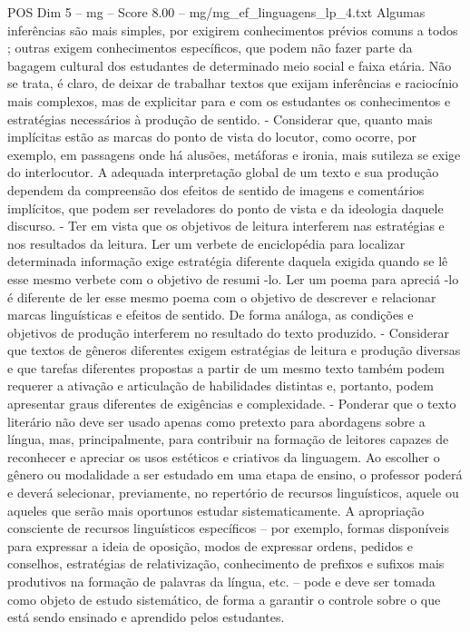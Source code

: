 \begin{textsample}{POS Dim 5 – mg – Score 8.00 – mg/mg\_ef\_linguagens\_lp\_4.txt}
Algumas inferências são mais simples, por exigirem conhecimentos prévios comuns a todos ; outras exigem conhecimentos específicos, que podem não fazer parte da bagagem cultural dos estudantes de determinado meio social e faixa etária.
Não se trata, é claro, de deixar de trabalhar textos que exijam inferências e raciocínio mais complexos, mas de explicitar para e com os estudantes os conhecimentos e estratégias necessários à produção de sentido. - Considerar que, quanto mais implícitas estão as marcas do ponto de vista do locutor, como ocorre, por exemplo, em passagens onde há alusões, metáforas e ironia, mais sutileza se exige do interlocutor.
A adequada interpretação global de um texto e sua produção dependem da compreensão dos efeitos de sentido de imagens e comentários implícitos, que podem ser reveladores do ponto de vista e da ideologia daquele discurso. - Ter em vista que os objetivos de leitura interferem nas estratégias e nos resultados da leitura.
Ler um verbete de enciclopédia para localizar determinada informação exige estratégia diferente daquela exigida quando se lê esse mesmo verbete com o objetivo de resumi -lo.
Ler um poema para apreciá -lo é diferente de ler esse mesmo poema com o objetivo de descrever e relacionar marcas linguísticas e efeitos de sentido.
De forma análoga, as condições e objetivos de produção interferem no resultado do texto produzido. - Considerar que textos de gêneros diferentes exigem estratégias de leitura e produção diversas e que tarefas diferentes propostas a partir de um mesmo texto também podem requerer a ativação e articulação de habilidades distintas e, portanto, podem apresentar graus diferentes de exigências e complexidade. - Ponderar que o texto literário não deve ser usado apenas como pretexto para abordagens sobre a língua, mas, principalmente, para contribuir na formação de leitores capazes de reconhecer e apreciar os usos estéticos e criativos da linguagem.
Ao escolher o gênero ou modalidade a ser estudado em uma etapa de ensino, o professor poderá e deverá selecionar, previamente, no repertório de recursos linguísticos, aquele ou aqueles que serão mais oportunos estudar sistematicamente.
A apropriação consciente de recursos linguísticos específicos – por exemplo, formas disponíveis para expressar a ideia de oposição, modos de expressar ordens, pedidos e conselhos, estratégias de relativização, conhecimento de prefixos e sufixos mais produtivos na formação de palavras da língua, etc. – pode e deve ser tomada como objeto de estudo sistemático, de forma a garantir o controle sobre o que está sendo ensinado e aprendido pelos estudantes.

\end{textsample}
